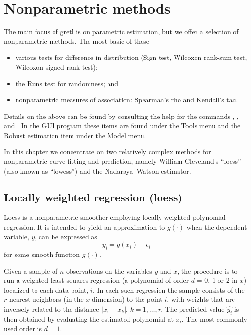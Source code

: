 \chapter{Nonparametric methods}
\label{chap-nonparam}

The main focus of gretl is on parametric estimation, but we offer a
selection of nonparametric methods. The most basic of these
%
\begin{itemize}
\item various tests for difference in distribution (Sign test,
  Wilcoxon rank-sum test, Wilcoxon signed-rank test);
\item the Runs test for randomness; and
\item nonparametric measures of association: Spearman's rho and
  Kendall's tau.
\end{itemize}

Details on the above can be found by consulting the help for the
commands , ,  and .
In the GUI program these items are found under the \textsf{Tools} menu
and the \textsf{Robust estimation} item under the \textsf{Model} menu.

In this chapter we concentrate on two relatively complex methods for
nonparametric curve-fitting and prediction, namely William
Cleveland's ``loess'' (also known as ``lowess'') and the
Nadaraya--Watson estimator.

\section{Locally weighted regression (loess)}
\label{sec:loess}

Loess \citep{cleveland79} is a nonparametric smoother employing
locally weighted polynomial regression. It is intended to yield an
approximation to $g(\cdot)$ when the dependent variable, $y$, can be
expressed as
\[
y_i = g(x_i) + \epsilon_i
\]
for some smooth function $g(\cdot)$.

Given a sample of $n$ observations on the variables $y$ and $x$, the
procedure is to run a weighted least squares regression (a polynomial
of order $d$ = 0, 1 or 2 in $x$) localized to each data point, $i$. In
each such regression the sample consists of the $r$ nearest neighbors
(in the $x$ dimension) to the point $i$, with weights that are
inversely related to the distance $|x_i - x_k|$, $k=1,\dots,r$. The
predicted value $\hat{y_i}$ is then obtained by evaluating the
estimated polynomial at $x_i$. The most commonly used order is $d=1$.

